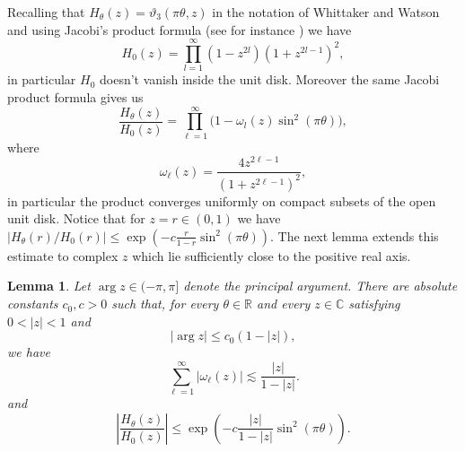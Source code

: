 \documentclass{article}
\newcommand{\R}{\mathbb R}
\theoremstyle{plain}
\newtheorem{lemma}[theorem]{Lemma}
\numberwithin{equation}{section}
\begin{document}
    Recalling   that \(H_\theta(z)=\vartheta_3(\pi\theta,z)\) in the notation of Whittaker and Watson and using Jacobi's product formula (see for instance \cite[\S\S~21.3 and 21.42, pp.~469--470 and 472--473]{WhittakerWatson}) we have 
    \[
    H_0(z)=\prod_{l=1}^\infty(1-z^{2l})(1+z^{2l-1})^2,
    \]
    in particular $H_0$ doesn't vanish inside the unit disk. Moreover the same Jacobi product formula gives us
    \begin{equation} \label{eq:product for H quotient}
        \frac{H_\theta(z)}{H_0(z)}= \prod_{\ell=1}^\infty\big(1-\omega_l(z) \sin^2(\pi \theta) \big),
    \end{equation}
    where
    \begin{equation*}
        \omega_{\ell}(z)= \frac{4z^{2\ell-1}}{(1+z^{2\ell-1})^2},
    \end{equation*}
    in particular the product converges uniformly on compact subsets of the open unit disk.
     Notice that for $z=r \in (0,1)$ we have $|H_\theta(r)/H_0(r)| \le \exp (- c \frac{r}{1-r} \sin^2 (\pi \theta))$. The next lemma extends this estimate to complex \(z\) which lie sufficiently close to the positive real axis.
    \begin{lemma} \label{lemma: bound for quotient of H(z)}
        Let \(\arg z\in(-\pi,\pi]\) denote the principal argument.  There are
absolute constants $c_0,c>0$ such that, for every $\theta\in\R$ and every
$z\in\mathbb C$ satisfying $0<|z|<1$ and
\begin{equation*}
 |\arg z|\leq c_0(1-|z|),
\end{equation*}
we have
\begin{equation} \label{eq: sum omega ell bound}
    \sum_{\ell=1}^\infty |\omega_\ell(z)| \lesssim \frac{|z|}{1-|z|}.
\end{equation}
and
\begin{equation}\label{eq:euclidean-Stolz-decay}
 \left|\frac{H_\theta(z)}{H_0(z)}\right|
 \leq\exp\left(-c\frac{|z|}{1-|z|}\sin^2(\pi \theta)\right).
\end{equation}
\end{lemma}
\end{document}
